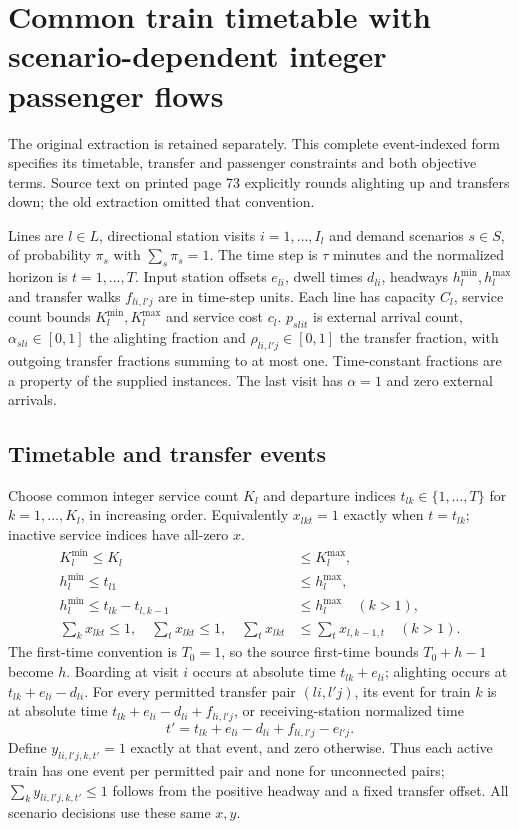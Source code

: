 \documentclass{article}
\begin{document}
\section*{Common train timetable with scenario-dependent integer passenger flows}
The original extraction is retained separately. This complete event-indexed
form specifies its timetable, transfer and passenger constraints and both
objective terms. Source text on printed page 73 explicitly rounds alighting
up and transfers down; the old extraction omitted that convention.

Lines are $l\in L$, directional station visits $i=1,\ldots,I_l$ and demand
scenarios $s\in S$, of probability $\pi_s$ with $\sum_s\pi_s=1$.
The time step is $\tau$ minutes and the normalized horizon is $t=1,\ldots,T$.
Input station offsets $e_{li}$, dwell times $d_{li}$, headways
$h_l^{\min},h_l^{\max}$ and transfer walks $f_{li,l'j}$ are in time-step
units. Each line has capacity $C_l$, service count bounds
$K_l^{\min},K_l^{\max}$ and service cost $c_l$.
$p_{slit}$ is external arrival count, $\alpha_{sli}\in[0,1]$ the
alighting fraction and $\rho_{li,l'j}\in[0,1]$ the transfer fraction,
with outgoing transfer fractions summing to at most one.
Time-constant fractions are a property of the supplied instances.
The last visit has $\alpha=1$ and zero external arrivals.

\subsection*{Timetable and transfer events}
Choose common integer service count $K_l$ and departure indices
$t_{lk}\in\{1,\ldots,T\}$ for $k=1,\ldots,K_l$, in increasing order.
Equivalently $x_{lkt}=1$ exactly when $t=t_{lk}$; inactive service indices
have all-zero $x$.
\begin{align}
K_l^{\min}\le K_l&\le K_l^{\max},\\
h_l^{\min}\le t_{l1}&\le h_l^{\max},\\
h_l^{\min}\le t_{lk}-t_{l,k-1}&\le h_l^{\max}\quad(k>1),\\
\sum_kx_{lkt}\le1,\quad \sum_tx_{lkt}\le1,\quad
\sum_tx_{lkt}&\le\sum_tx_{l,k-1,t}\quad(k>1).
\end{align}
The first-time convention is $T_0=1$, so the source first-time bounds
$T_0+h-1$ become $h$. Boarding at visit $i$ occurs at absolute time
$t_{lk}+e_{li}$; alighting occurs at $t_{lk}+e_{li}-d_{li}$.
For every permitted transfer pair $(li,l'j)$, its event for train $k$ is
at absolute time $t_{lk}+e_{li}-d_{li}+f_{li,l'j}$, or receiving-station
normalized time
\[
t'=t_{lk}+e_{li}-d_{li}+f_{li,l'j}-e_{l'j}.
\]
Define $y_{li,l'j,k,t'}=1$ exactly at that event, and zero otherwise.
Thus each active train has one event per permitted pair and none for
unconnected pairs; $\sum_k y_{li,l'j,k,t'}\le1$ follows from the positive
headway and a fixed transfer offset. All scenario decisions use these
same $x,y$.
\end{document}
